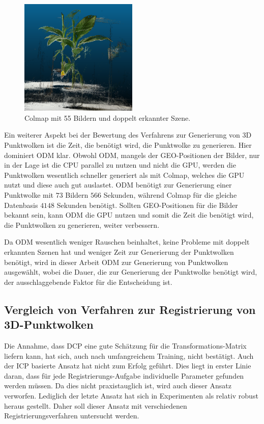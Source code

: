 \documentclass[12pt,titlepage, twoside]{article}
\begin{document}
\begin{figure}
    \centering
        \includegraphics[width=0.5\textwidth]{./Images/ColmapDuplicatedScene.png}
        \caption{Colmap mit 55 Bildern und doppelt erkannter Szene.}
        \label{fig:ColmapDuplicatedScene}
\end{figure}

Ein weiterer Aspekt bei der Bewertung des Verfahrens zur Generierung von 3D Punktwolken ist die Zeit, die benötigt wird, die Punktwolke zu generieren.
Hier dominiert ODM klar. 
Obwohl ODM, mangels der GEO-Positionen der Bilder, nur in der Lage ist die CPU parallel zu nutzen und nicht die GPU, werden die Punktwolken wesentlich schneller generiert als mit Colmap, welches die GPU nutzt und diese auch gut auslastet.
ODM benötigt zur Generierung einer Punktwolke mit $73$ Bildern $566$ Sekunden, während Colmap für die gleiche Datenbasis $4148$ Sekunden benötigt. 
Sollten GEO-Positionen für die Bilder bekannt sein, kann ODM die GPU nutzen und somit die Zeit die benötigt wird, die Punktwolken zu generieren, weiter verbessern.

Da ODM wesentlich weniger Rauschen beinhaltet, keine Probleme mit doppelt erkannten Szenen hat und weniger Zeit zur Generierung der Punktwolken benötigt, wird in dieser Arbeit ODM zur Generierung von Punktwolken ausgewählt, 
wobei die Dauer, die zur Generierung der Punktwolke benötigt wird, der ausschlaggebende Faktor für die Entscheidung ist.

\subsection{Vergleich von Verfahren zur Registrierung von 3D-Punktwolken}

Die Annahme, dass DCP eine gute Schätzung für die Transformations-Matrix liefern kann, hat sich, auch nach umfangreichem Training, nicht bestätigt. 
Auch der ICP basierte Ansatz hat nicht zum Erfolg geführt. Dies liegt in erster Linie daran, dass für jede Registrierungs-Aufgabe individuelle Parameter gefunden werden müssen.
Da dies nicht praxistauglich ist, wird auch dieser Ansatz verworfen.
Lediglich der letzte Ansatz hat sich in Experimenten als relativ robust heraus gestellt. Daher soll dieser Ansatz mit verschiedenen Registrierungsverfahren untersucht werden.
\end{document}

